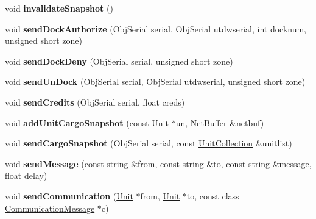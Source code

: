 \begin{DoxyCompactItemize}
\item 
void {\bfseries invalidate\+Snapshot} ()\hypertarget{classNetServer_afce30512c3356d17a1ebe3b143beb38d}{}\label{classNetServer_afce30512c3356d17a1ebe3b143beb38d}

\item 
void {\bfseries send\+Dock\+Authorize} (Obj\+Serial serial, Obj\+Serial utdwserial, int docknum, unsigned short zone)\hypertarget{classNetServer_aa60f9265ed8ef866661febdc6cd16e6b}{}\label{classNetServer_aa60f9265ed8ef866661febdc6cd16e6b}

\item 
void {\bfseries send\+Dock\+Deny} (Obj\+Serial serial, unsigned short zone)\hypertarget{classNetServer_a0ffaba942ad71aa4b3c4bb9b1004e02c}{}\label{classNetServer_a0ffaba942ad71aa4b3c4bb9b1004e02c}

\item 
void {\bfseries send\+Un\+Dock} (Obj\+Serial serial, Obj\+Serial utdwserial, unsigned short zone)\hypertarget{classNetServer_ab6616c72c08d3bebdfb1ddbbff9c791a}{}\label{classNetServer_ab6616c72c08d3bebdfb1ddbbff9c791a}

\item 
void {\bfseries send\+Credits} (Obj\+Serial serial, float creds)\hypertarget{classNetServer_a8dd4f612096cbd28e102b1fabbb916ea}{}\label{classNetServer_a8dd4f612096cbd28e102b1fabbb916ea}

\item 
void {\bfseries add\+Unit\+Cargo\+Snapshot} (const \hyperlink{classUnit}{Unit} $\ast$un, \hyperlink{classNetBuffer}{Net\+Buffer} \&netbuf)\hypertarget{classNetServer_a306501bf1fe1965a37ce1c8c64a03d39}{}\label{classNetServer_a306501bf1fe1965a37ce1c8c64a03d39}

\item 
void {\bfseries send\+Cargo\+Snapshot} (Obj\+Serial serial, const \hyperlink{classUnitCollection}{Unit\+Collection} \&unitlist)\hypertarget{classNetServer_ab3e318ffdbc70cf629a792537dd22fe9}{}\label{classNetServer_ab3e318ffdbc70cf629a792537dd22fe9}

\item 
void {\bfseries send\+Message} (const string \&from, const string \&to, const string \&message, float delay)\hypertarget{classNetServer_a5112ee2452821f9dbd1ceae715290310}{}\label{classNetServer_a5112ee2452821f9dbd1ceae715290310}

\item 
void {\bfseries send\+Communication} (\hyperlink{classUnit}{Unit} $\ast$from, \hyperlink{classUnit}{Unit} $\ast$to, const class \hyperlink{classCommunicationMessage}{Communication\+Message} $\ast$c)\hypertarget{classNetServer_a209b19d2ffe21a5ced642b2d4a37c66c}{}\label{classNetServer_a209b19d2ffe21a5ced642b2d4a37c66c}


\end{DoxyCompactItemize}
